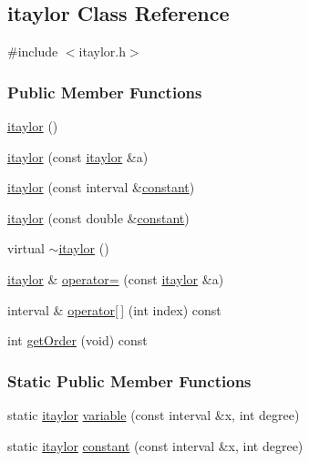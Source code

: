 \hypertarget{classitaylor}{\subsection{itaylor \-Class \-Reference}
\label{classitaylor}
}


{\ttfamily \#include $<$itaylor.\-h$>$}

\subsubsection*{\-Public \-Member \-Functions}
\begin{DoxyCompactItemize}
\item 
\hyperlink{classitaylor_a265623bc1a74c5677c0b356317691808}{itaylor} ()
\item 
\hyperlink{classitaylor_a12241a58e4d5de9efd24293e9c646ff1}{itaylor} (const \hyperlink{classitaylor}{itaylor} \&a)
\item 
\hyperlink{classitaylor_a49508643f0a5beba907408f81e4a870e}{itaylor} (const interval \&\hyperlink{classitaylor_a26ce2edd74c4225bd48d226bbd844d00}{constant})
\item 
\hyperlink{classitaylor_ac3f49c2df21c83051943e33f4f40550d}{itaylor} (const double \&\hyperlink{classitaylor_a26ce2edd74c4225bd48d226bbd844d00}{constant})
\item 
virtual \hyperlink{classitaylor_a4113323f2bf9f195b8a4a627a15f0509}{$\sim$itaylor} ()
\item 
\hyperlink{classitaylor}{itaylor} \& \hyperlink{classitaylor_a5edad8cbc893a1ae05cc535675d99ce3}{operator=} (const \hyperlink{classitaylor}{itaylor} \&a)
\item 
interval \& \hyperlink{classitaylor_a103e7ee5e21bccf03ad500086927443c}{operator\mbox{[}$\,$\mbox{]}} (int index) const 
\item 
int \hyperlink{classitaylor_a589de5c87d9993888423598c42be5f07}{get\-Order} (void) const 
\end{DoxyCompactItemize}
\subsubsection*{\-Static \-Public \-Member \-Functions}
\begin{DoxyCompactItemize}
\item 
static \hyperlink{classitaylor}{itaylor} \hyperlink{classitaylor_a2c8074fdc97258d6581ce18a6d76d8d8}{variable} (const interval \&x, int degree)
\item 
static \hyperlink{classitaylor}{itaylor} \hyperlink{classitaylor_a26ce2edd74c4225bd48d226bbd844d00}{constant} (const interval \&x, int degree)
\end{DoxyCompactItemize}

